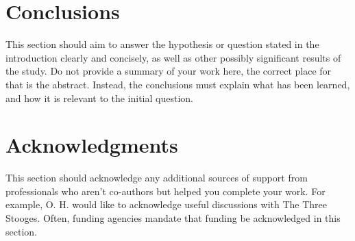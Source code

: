 \documentclass[11pt]{article}
\begin{document}
\section{Conclusions}

This section should aim to answer the hypothesis or question stated in
the introduction clearly and concisely, as well as other possibly
significant results of the study. Do not provide a summary of your work
here, the correct place for that is the abstract. Instead, the
conclusions must explain what has been learned, and how it is relevant to the
initial question.

\section*{Acknowledgments}

This section should acknowledge any additional sources of support from
professionals who aren't co-authors but helped you complete your work. For
example, O. H. would like to acknowledge useful discussions with The
Three Stooges. Often, funding agencies mandate that funding be
acknowledged in this section. 

\printbibliography
\end{document}
